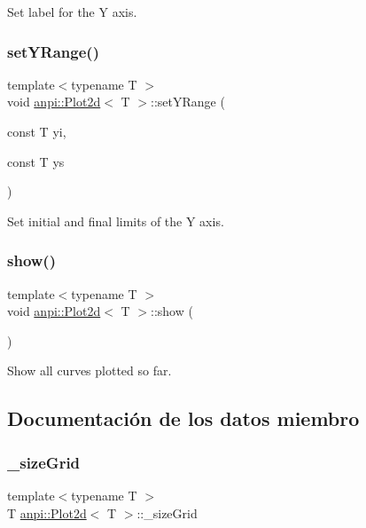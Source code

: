 Set label for the Y axis. 

\mbox{\label{classanpi_1_1Plot2d_a5bac0f99358cd81f048cc5c5bc69ffda}} 
\subsubsection{\texorpdfstring{set\+Y\+Range()}{setYRange()}}
{\footnotesize\ttfamily template$<$typename T $>$ \\
void \hyperlink{classanpi_1_1Plot2d}{anpi\+::\+Plot2d}$<$ T $>$\+::set\+Y\+Range (\begin{DoxyParamCaption}\item[{const T}]{yi,  }\item[{const T}]{ys }\end{DoxyParamCaption})}



Set initial and final limits of the Y axis. 

\mbox{\label{classanpi_1_1Plot2d_a41165ac70edb258fa0fbcce04ddf7025}} 
\subsubsection{\texorpdfstring{show()}{show()}}
{\footnotesize\ttfamily template$<$typename T $>$ \\
void \hyperlink{classanpi_1_1Plot2d}{anpi\+::\+Plot2d}$<$ T $>$\+::show (\begin{DoxyParamCaption}{ }\end{DoxyParamCaption})}

Show all curves plotted so far. 

\subsection{Documentación de los datos miembro}
\mbox{\label{classanpi_1_1Plot2d_a2730a5c9f7b2b120c897672209aa580e}} 
\subsubsection{\texorpdfstring{\+\_\+size\+Grid}{\_sizeGrid}}
{\footnotesize\ttfamily template$<$typename T $>$ \\
T \hyperlink{classanpi_1_1Plot2d}{anpi\+::\+Plot2d}$<$ T $>$\+::\+\_\+size\+Grid\hspace{0.3cm}{\ttfamily [private]}}


